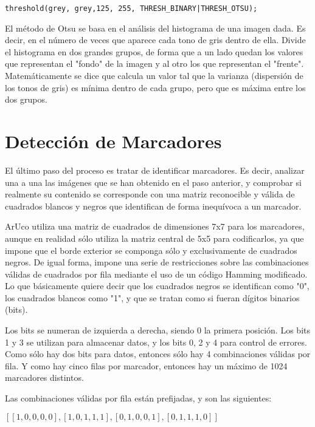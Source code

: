 \documentclass[10pt,a4paper]{article}
\begin{document}
\begin{lstlisting}[style=C++]
threshold(grey, grey,125, 255, THRESH_BINARY|THRESH_OTSU);
\end{lstlisting} 

El método de Otsu se basa en el análisis del histograma de una imagen dada. Es decir, en el número de veces que aparece cada tono de gris dentro de ella. Divide el histograma en dos grandes grupos, de forma que a un lado quedan los valores que representan el "fondo" de la imagen y al otro los que representan el "frente". Matemáticamente se dice que calcula un valor tal que la varianza (dispersión de los tonos de gris) es mínima dentro de cada grupo, pero que es máxima entre los dos grupos.

\section{Detección de Marcadores}

El último paso del proceso es tratar de identificar marcadores. Es decir, analizar una a una las imágenes que se han obtenido en el paso anterior, y comprobar si realmente su contenido se corresponde con una matriz reconocible y válida de cuadrados blancos y negros que identifican de forma inequívoca a un marcador.

ArUco utiliza una matriz de cuadrados de dimensiones 7x7 para los marcadores, aunque en realidad sólo utiliza la matriz central de 5x5 para codificarlos, ya que impone que el borde exterior se componga sólo y exclusivamente de cuadrados negros. De igual forma, impone una serie de restricciones sobre las combinaciones válidas de cuadrados por fila mediante el uso de un código Hamming modificado. Lo que básicamente quiere decir que los cuadrados negros se identifican como "0", los cuadrados blancos como "1", y que se tratan como si fueran dígitos binarios (bits).

Los bits se numeran de izquierda a derecha, siendo 0 la primera posición. Los bits 1 y 3 se utilizan para almacenar datos, y los bits 0, 2 y 4 para control de errores. Como sólo hay dos bits para datos, entonces sólo hay 4 combinaciones válidas por fila. Y como hay cinco filas por marcador, entonces hay un máximo de 1024 marcadores distintos.

Las combinaciones válidas por fila están prefijadas, y son las siguientes:

\begin{center}
$[ [1,0,0,0,0], [1,0,1,1,1], [0,1,0,0,1], [0,1,1,1,0] ]$
\end{center}
\end{document}
